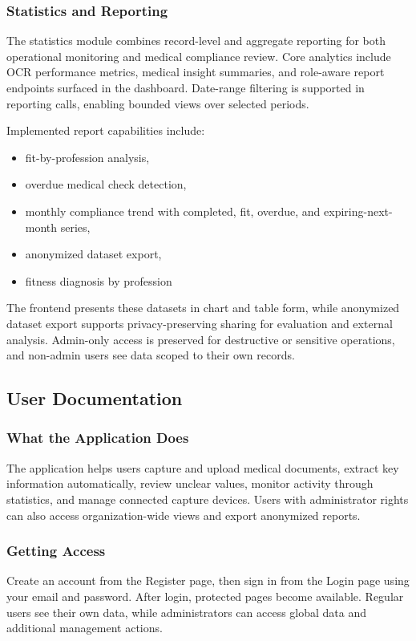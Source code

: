 \documentclass[12pt,a4paper]{article}
\begin{document}
    \subsubsection{Statistics and Reporting}
    The statistics module combines record-level and aggregate reporting for both
    operational monitoring and medical compliance review. Core analytics include
    OCR performance metrics, medical insight summaries, and role-aware report
    endpoints surfaced in the dashboard. Date-range filtering is supported in
    reporting calls, enabling bounded views over selected periods.

    Implemented report capabilities include:
    \begin{itemize}[leftmargin=*]
        \item fit-by-profession analysis,
        \item overdue medical check detection,
        \item monthly compliance trend with completed, fit, overdue, and
        expiring-next-month series,
        \item anonymized dataset export,
        \item fitness diagnosis by profession
    \end{itemize}
    The frontend
    presents these datasets in chart and table form, while anonymized dataset
    export supports privacy-preserving sharing for evaluation and external
    analysis. Admin-only access is preserved for destructive or sensitive
    operations, and non-admin users see data scoped to their own records.

\subsection{User Documentation}

\subsubsection{What the Application Does}
The application helps users capture and upload medical documents, extract key
information automatically, review unclear values, monitor activity through
statistics, and manage connected capture devices. Users with administrator
rights can also access organization-wide views and export anonymized reports.

\subsubsection{Getting Access}
Create an account from the Register page, then sign in from the Login page
using your email and password. After login, protected pages become available.
Regular users see their own data, while administrators can access global data
and additional management actions.
\end{document}
